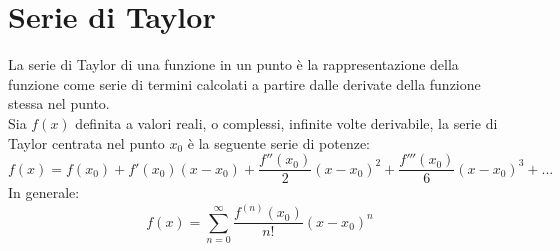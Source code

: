 \chapter{Serie di Taylor}
La serie di Taylor di una funzione in un punto è la rappresentazione della funzione come serie di termini calcolati a partire dalle derivate della funzione stessa nel punto.
\\Sia $f(x)$ definita a valori reali, o complessi, infinite volte derivabile, la serie di Taylor centrata nel punto $x_0$ è la seguente serie di potenze:
\begin{equation*}
	f(x) = f(x_{0}) + f'(x_{0})(x-x_{0}) + \dfrac{f''(x_{0})}{2}(x-x_{0})^{2}	+ \dfrac{f'''(x_{0})}{6}(x-x_{0})^{3} + ...
\end{equation*} 
In generale:
\begin{equation}
	f(x) = \sum_{n=0}^{\infty} \dfrac{f^{(n)}(x_{0})}{n!}(x-x_{0})^{n}
\end{equation}
